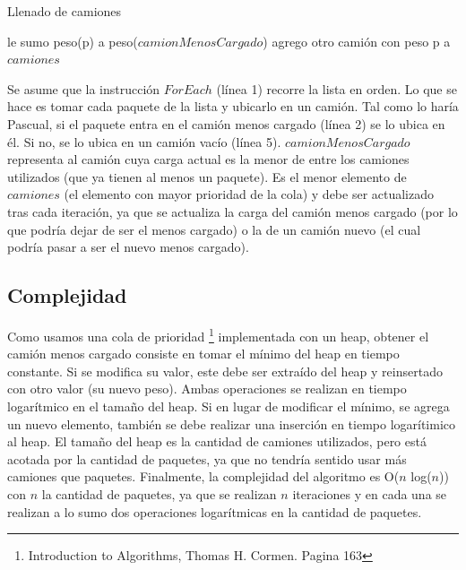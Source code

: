 \begin{algorithm}[H]
	\caption{Llenado de camiones}
	\begin{algorithmic}
	 {
		 {
			le sumo peso(p) a peso($camionMenosCargado$)\;
		}{
			agrego otro camión con peso p a $camiones$\;
		}
	}
	\end{algorithmic}
\end{algorithm}

\par{Se asume que la instrucci\'on $ForEach$ (l\'inea 1) recorre la lista en orden. Lo que se hace es tomar cada paquete de la lista y ubicarlo en un cami\'on. Tal como lo har\'ia Pascual, si el paquete entra en el cami\'on menos cargado (l\'inea 2) se lo ubica en \'el. Si no, se lo ubica en un cami\'on vac\'io (l\'inea 5). $camionMenosCargado$ representa al cami\'on cuya carga actual es la menor de entre los camiones utilizados (que ya tienen al menos un paquete). Es el menor elemento de $camiones$ (el elemento con mayor prioridad de la cola) y debe ser actualizado tras cada iteraci\'on, ya que se actualiza la carga del cami\'on menos cargado (por lo que podr\'ia dejar de ser el menos cargado) o la de un cami\'on nuevo (el cual podr\'ia pasar a ser el nuevo menos cargado).}

\subsection{Complejidad}
\par{Como usamos una cola de prioridad \footnote{Introduction to Algorithms, Thomas H. Cormen. Pagina 163 } implementada con un heap, obtener el cami\'on menos cargado consiste en tomar el m\'inimo del heap en tiempo constante. Si se modifica su valor, este debe ser extra\'ido del heap y reinsertado con otro valor (su nuevo peso). Ambas operaciones se realizan en tiempo logar\'itmico en el tama\~no del heap. Si en lugar de modificar el m\'inimo, se agrega un nuevo elemento, tambi\'en se debe realizar una inserci\'on en tiempo logar\'itimico al heap. El tama\~no del heap es la cantidad de camiones utilizados, pero est\'a acotada por la cantidad de paquetes, ya que no tendr\'ia sentido usar m\'as camiones que paquetes. Finalmente, la complejidad del algoritmo es O($n$ log($n$)) con $n$ la cantidad de paquetes, ya que se realizan $n$ iteraciones y en cada una se realizan a lo sumo dos operaciones logar\'itmicas en la cantidad de paquetes.}

